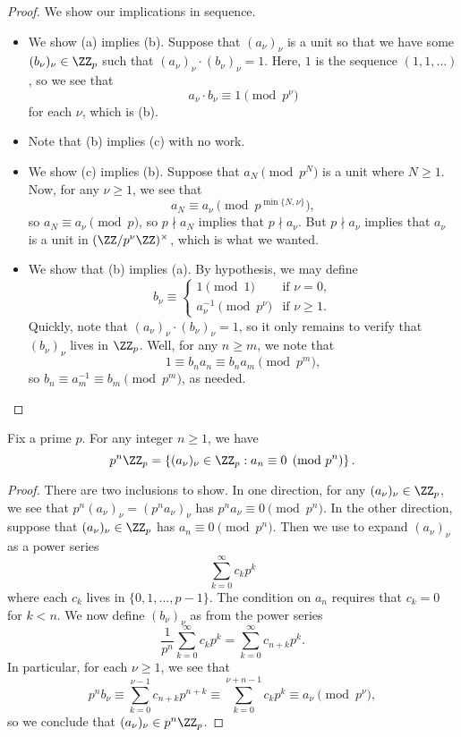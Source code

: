 \documentclass[../notes.tex]{subfiles}
\begin{document}
\begin{proof}
	We show our implications in sequence.
	\begin{itemize}
		\item We show (a) implies (b). Suppose that $(a_\nu)_\nu$ is a unit so that we have some $(b_\nu)_\nu\in\ZZ_p$ such that $(a_\nu)_\nu\cdot(b_\nu)_\nu=1$. Here, $1$ is the sequence $(1,1,\ldots)$, so we see that
		\[a_\nu\cdot b_\nu\equiv1\pmod{p^\nu}\]
		for each $\nu$, which is (b).
		\item Note that (b) implies (c) with no work.
		\item We show (c) implies (b). Suppose that $a_N\pmod{p^N}$ is a unit where $N\ge1$. Now, for any $\nu\ge1$, we see that
		\[a_N\equiv a_\nu\pmod{p^{\min\{N,\nu\}}},\]
		so $a_N\equiv a_\nu\pmod p$, so $p\nmid a_N$ implies that $p\nmid a_\nu$. But $p\nmid a_\nu$ implies that $a_\nu$ is a unit in $(\ZZ/p^\nu\ZZ)^\times$, which is what we wanted.
		\item We show that (b) implies (a). By hypothesis, we may define
		\[b_\nu\equiv\begin{cases}
			1\pmod1 & \text{if }\nu=0, \\
			a_\nu^{-1}\pmod{p^\nu} & \text{if }\nu\ge1.
		\end{cases}\]
		Quickly, note that $(a_\nu)_\nu\cdot(b_\nu)_\nu=1$, so it only remains to verify that $(b_\nu)_\nu$ lives in $\ZZ_p$. Well, for any $n\ge m$, we note that
		\[1\equiv b_na_n\equiv b_na_m\pmod{p^m},\]
		so $b_n\equiv a_m^{-1}\equiv b_m\pmod{p^m}$, as needed.
		\qedhere
	\end{itemize}
\end{proof}
\begin{lemma} \label{lem:principal-ideals-zp}
	Fix a prime $p$. For any integer $n\ge1$, we have
	\[p^n\ZZ_p=\left\{(a_\nu)_\nu\in\ZZ_p:a_n\equiv0\pmod{p^n}\right\}.\]
\end{lemma}
\begin{proof}
	There are two inclusions to show. In one direction, for any $(a_\nu)_\nu\in\ZZ_p$, we see that $p^n(a_\nu)_\nu=\left(p^na_\nu\right)_\nu$ has $p^na_\nu\equiv0\pmod{p^n}$. In the other direction, suppose that $(a_\nu)_\nu\in\ZZ_p$ has $a_n\equiv0\pmod{p^n}$. Then we use  to expand $(a_\nu)_\nu$ as a power series
	\[\sum_{k=0}^\infty c_kp^k\]
	where each $c_k$ lives in $\{0,1,\ldots,p-1\}$. The condition on $a_n$ requires that $c_k=0$ for $k<n$. We now define $(b_\nu)_\nu$ as from the power series
	\[\frac1{p^n}\sum_{k=0}^\infty c_kp^k=\sum_{k=0}^\infty c_{n+k}p^k.\]
	In particular, for each $\nu\ge1$, we see that
	\[p^nb_\nu\equiv\sum_{k=0}^{\nu-1}c_{n+k}p^{n+k}\equiv\sum_{k=0}^{\nu+n-1}c_kp^k\equiv a_\nu\pmod{p^\nu},\]
	so we conclude that $(a_\nu)_\nu\in p^n\ZZ_p$.
\end{proof}
\end{document}
